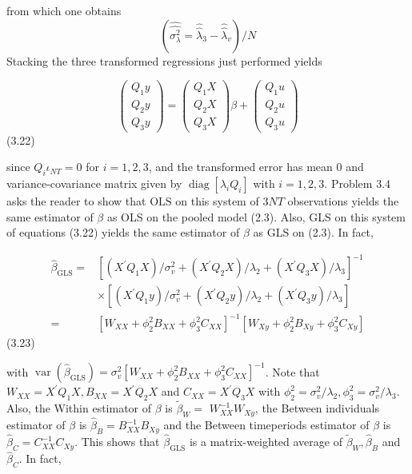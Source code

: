 \documentclass[
]{book}
\begin{document}
from which one obtains
\[ (\widehat{\widehat {\sigma_\lambda^2} }= \widehat{\widehat {\lambda} }_3 -  \widehat{\widehat {\lambda} }_v)/N \] Stacking the three transformed regressions just
performed yields

\begin{equation}
\left(\begin{array}{l}
Q_{1} y \\
Q_{2} y \\
Q_{3} y
\end{array}\right)=\left(\begin{array}{l}
Q_{1} X \\
Q_{2} X \\
Q_{3} X
\end{array}\right) \beta+\left(\begin{array}{l}
Q_{1} u \\
Q_{2} u \\
Q_{3} u
\end{array}\right)
\end{equation} (3.22)

since \(Q_{i} \iota_{N T}=0\) for \(i=1,2,3\), and the transformed error has mean 0 and variance-covariance matrix given by \(\operatorname{diag}\left[\lambda_{i} Q_{i}\right]\) with \(i=1,2,3 .\) Problem \(3.4\) asks the reader to show that \(\mathrm{OLS}\) on this system of \(3 N T\) observations yields the same estimator of \(\beta\) as OLS on the pooled model (2.3). Also, GLS on this system of equations (3.22) yields the same estimator of \(\beta\) as GLS on (2.3). In fact,

\begin{equation}
\begin{aligned}
\widehat{\beta}_{\mathrm{GLS}}=&\left[\left(X^{\prime} Q_{1} X\right) / \sigma_{v}^{2}+\left(X^{\prime} Q_{2} X\right) / \lambda_{2}+\left(X^{\prime} Q_{3} X\right) / \lambda_{3}\right]^{-1} \\
& \times\left[\left(X^{\prime} Q_{1} y\right) / \sigma_{v}^{2}+\left(X^{\prime} Q_{2} y\right) / \lambda_{2}+\left(X^{\prime} Q_{3} y\right) / \lambda_{3}\right] \\
=&\left[W_{X X}+\phi_{2}^{2} B_{X X}+\phi_{3}^{2} C_{X X}\right]^{-1}\left[W_{X y}+\phi_{2}^{2} B_{X y}+\phi_{3}^{2} C_{X y}\right]
\end{aligned}
\end{equation} (3.23)

with \(\operatorname{var}\left(\widehat{\beta}_{\mathrm{GLS}}\right)=\sigma_{v}^{2}\left[W_{X X}+\phi_{2}^{2} B_{X X}+\phi_{3}^{2} C_{X X}\right]^{-1}\). Note that \(W_{X X}=X^{\prime} Q_{1} X, B_{X X}=X^{\prime} Q_{2} X\)
and \(C_{X X}=X^{\prime} Q_{3} X\) with \(\phi_{2}^{2}=\sigma_{v}^{2} / \lambda_{2}, \phi_{3}^{2}=\sigma_{v}^{2} / \lambda_{3} .\) Also, the Within estimator of \(\beta\) is \(\widetilde{\beta}_{W}=\)
\(W_{X X}^{-1} W_{X y}\), the Between individuals estimator of \(\beta\) is \(\widehat{\beta}_{B}=B_{X X}^{-1} B_{X y}\) and the Between timeperiods estimator of \(\beta\) is \(\widehat{\beta}_{C}=C_{X X}^{-1} C_{X y}\). This shows that \(\widehat{\beta}_{\mathrm{GLS}}\) is a matrix-weighted average of \(\widetilde{\beta}_{W}, \widehat{\beta}_{B}\) and \(\widehat{\beta}_{C}\). In fact,
\end{document}
